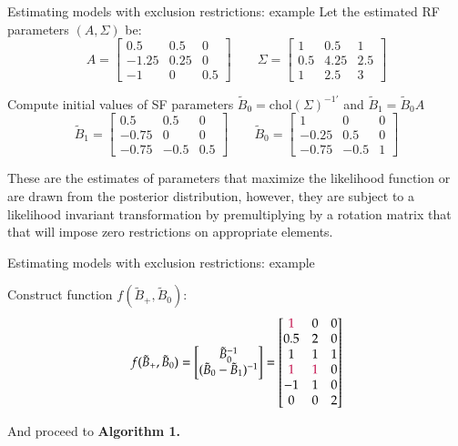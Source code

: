 \documentclass[notes,blackandwhite,mathsans,usenames,dvipsnames]{beamer}
\begin{document}
\begin{frame}{Estimating models with exclusion restrictions: example}
\small
{\color{mcxs2}Let the estimated RF parameters} $(A,\Sigma)$ {\color{mcxs2}be:}\footnotesize
$$A = \begin{bmatrix}0.5 & 0.5 &  0 \\-1.25& 0.25&  0\\-1& 0&  0.5\end{bmatrix}\qquad
\Sigma=\begin{bmatrix}1& 0.5&  1\\0.5& 4.25&  2.5\\1& 2.5&  3\end{bmatrix}$$

\small {\color{mcxs2}Compute initial values of SF parameters} $\tilde{B}_0=\text{chol}(\Sigma)^{-1\prime}$ {\color{mcxs2}and} $\tilde{B}_1=\tilde{B}_0A$\footnotesize
$$\tilde{B}_1 = \begin{bmatrix}0.5&  0.5 & 0\\-0.75 & 0&  0\\-0.75& -0.5&  0.5\end{bmatrix}\qquad
\tilde{B}_0 = \begin{bmatrix}1& 0&  0\\-0.25&  0.5& 0\\-0.75& -0.5&1\end{bmatrix}$$

\smallskip\small {\color{mcxs2}These are the estimates of parameters that maximize the likelihood function or are drawn from the posterior distribution, however, they are subject to a likelihood invariant transformation by premultiplying by a rotation matrix that that will impose zero restrictions on appropriate elements.}

\end{frame}





\begin{frame}{Estimating models with exclusion restrictions: example}

{\color{mcxs2}Construct function} $f(\tilde{B}_+,\tilde{B}_0)$:
$$f(\tilde{B}_+,\tilde{B}_0) = \begin{bmatrix}\tilde{B}_0^{-1}\\ (\tilde{B}_0-\tilde{B}_1)^{-1}\end{bmatrix}=
\begin{bmatrix} {\color{purple}1}&0&0\\0.5&2&0\\1&1&1\\{\color{purple}1}&{\color{purple}1}&0\\-1&1&0\\0&0&2 \end{bmatrix}$$

{\color{mcxs2}And proceed to} \textbf{Algorithm 1.}

\end{frame}
\end{document}
